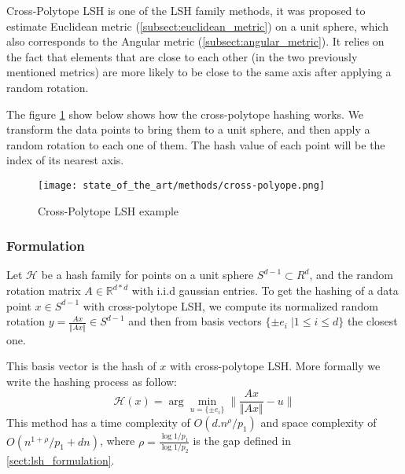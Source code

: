 Cross-Polytope LSH is one of the LSH family methods, it was proposed to estimate
Euclidean metric (\ref{subsect:euclidean_metric}) on a unit sphere, which also
corresponds to the Angular metric (\ref{subsect:angular_metric}). It relies on
the fact that elements that are close to each other (in the two previously
mentioned metrics) are more likely to be close to the same axis after applying a
random rotation. \citep{andoni_practicalsh_2015}

The figure \ref{fig:crosspolytope_example} show below shows how the
cross-polytope hashing works. We transform the data points to bring them to a
unit sphere, and then apply a random rotation to each one of them. The hash
value of each point will be the index of its nearest axis.

\begin{figure}[ht]
    \centering
    \texttt{[image: state\_of\_the\_art/methods/cross-polyope.png]}
    \caption{Cross-Polytope LSH example}
    \label{fig:crosspolytope_example}
\end{figure}

\subsubsection{Formulation}
Let $\mathcal{H}$ be a hash family for points on a unit sphere  $S^{d-1} \subset
    R^d$, and the random rotation matrix $A \in \mathbb{R}^{d*d}$ with i.i.d
gaussian entries. To get the hashing of a data point $x \in S^{d-1}$ with
cross-polytope LSH, we compute its normalized random rotation $y = \frac{A x
    }{\Vert{A x} \Vert} \in  S^{d-1}$ and then from basis vectors $\lbrace \pm
    e_i \; \vert 1 \leq i \leq d \rbrace$ the closest one.

This basis vector is the hash of $x$ with cross-polytope LSH. More formally we
write the hashing process as follow:
$$
    \mathcal{H}(x) = \arg \min_{u = \lbrace \pm e_i \rbrace} \lVert \frac{A x }{\Vert{A x} \Vert} - u \rVert
$$
This method has a time complexity of $O(d.n^\rho / p_1)$ and space complexity of
$O(n^{1 + \rho} / p_1 + dn)$, where $\rho = \frac{\log{1/
            p_1}}{\log{1/ p_2}}$ is the gap defined in \ref{sect:lsh_formulation}.
\citep{indyk_2000}

